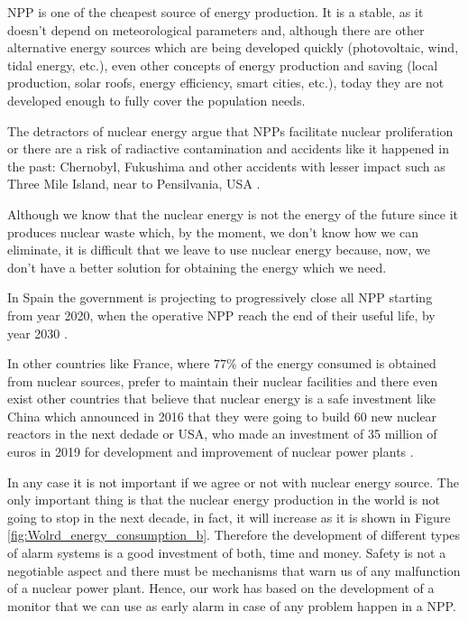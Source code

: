 NPP is one of the cheapest source of energy production. It is a stable, as it doesn't depend on  meteorological parameters and, although there are other alternative energy sources which are being developed quickly  (photovoltaic, wind, tidal energy, etc.), even other concepts of energy production and saving (local production, solar roofs, energy efficiency, smart cities, etc.), today they are not developed enough to fully cover the population needs.  

The detractors of nuclear energy argue that NPPs facilitate nuclear proliferation or there are a risk of radiactive contamination and accidents like it happened in the past: Chernobyl, Fukushima and other accidents with lesser impact such as Three Mile Island, near to Pensilvania, USA \cite{ThreeMileIsland}.

Although we know that the nuclear energy is not the energy of the future since it produces nuclear waste which, by the moment, we don't know how we can eliminate, it is difficult that we leave to use nuclear energy because, now, we don't have a better solution for obtaining the energy which we need. 

In Spain the government is projecting to progressively close all NPP starting from year 2020, when the operative NPP reach the end of their useful life, by year 2030 \cite{CloseNPP}. 

In other countries like France, where $77\%$ of the energy consumed is obtained from nuclear sources, prefer to maintain their nuclear facilities and there even exist other countries that believe that nuclear energy is a safe investment like China which announced in 2016 that they were going to build 60 new nuclear reactors in the next dedade \cite{60ReactorsChina} or USA, who made an investment of 35 million of euros in 2019 for development and improvement of nuclear power plants \cite{35MillionsUSA}. 

In any case it is not important if we agree or not with nuclear energy source. The only important thing is that the nuclear energy production in the world is not going to stop in the next decade, in fact, it will increase as it is shown in Figure \ref{fig:Wolrd_energy_consumption_b}. Therefore the development of  different types of alarm systems is a good investment of both, time and money. Safety is not a negotiable aspect and there must be mechanisms that warn us of any malfunction of a nuclear power plant. Hence, our work has based on the development of a monitor that we can use as early alarm in case of any problem happen in a NPP.

